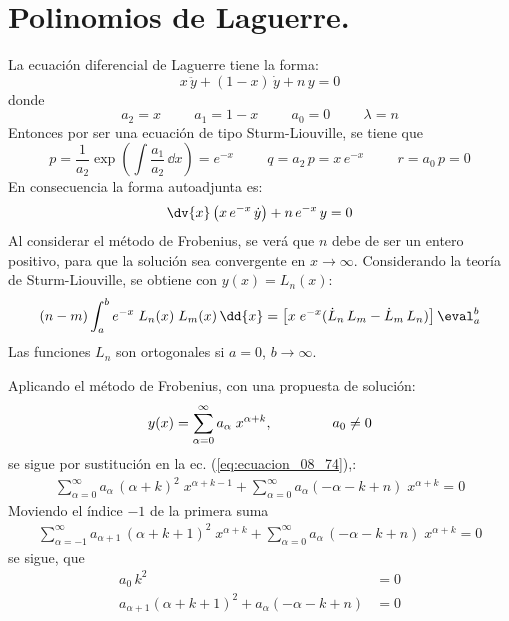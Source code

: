 \section{Polinomios de Laguerre.}
La ecuación diferencial de Laguerre tiene la forma:
\begin{equation}
x \, \ddot{y} + (1 - x) \, \dot{y} + n \, y = 0
\label{eq:ecuacion_08_74}
\end{equation}
donde
\[ a_{2} = x \hspace{1cm} a_{1} = 1 - x \hspace{1cm} a_{0} = 0 \hspace{1cm} \lambda = n \]
Entonces por ser una ecuación de tipo Sturm-Liouville, se tiene que
\[ p = \dfrac{1}{a_{2}} \exp \left( \int \frac{a_{1}}{a_{2}} \, \dd{x} \right) = e^{-x} \hspace{1cm} q = a_{2} \, p = x \, e^{-x} \hspace{1cm} r = a_{0} \, p = 0 \]
En consecuencia la forma autoadjunta es:
\[ \dv{x} \left( x \, e^{-x} \, \dot{y} \right) + n \, e^{-x} \,  y = 0  \]
Al considerar el método de Frobenius, se verá que $n$ debe de ser un entero positivo, para que la solución sea convergente en $x \to \infty$. Considerando la teoría de Sturm-Liouville, se obtiene con $y(x) = L_{n}(x)$:
\begin{equation}
(n - m) \int_{a}^{b} e^{-x} \; L_{n}(x) \; L_{m}(x) \, \dd{x} = \left[ x \; e^{-x} (\dot{L}_{n} \, L_{m} - \dot{L}_{m} \, L_{n}) \right]\eval_{a}^{b}
\label{eq:ecuacion_08_75}
\end{equation}
Las funciones $L_{n}$ son ortogonales si $a=0$, $b \to \infty$.
\par
Aplicando el método de Frobenius, con una propuesta de solución:
\[ y(x) = \sum_{\alpha = 0}^{\infty} a_{\alpha} \; x^{\alpha + k}, \hspace{1.5cm} a_{0} \neq 0 \]
se sigue por sustitución en la ec. (\ref{eq:ecuacion_08_74}),:
\begin{align*}
\sum_{\alpha = 0}^{\infty} a_{\alpha} \, (\alpha + k)^{2} \; x^{\alpha + k - 1} + \sum_{\alpha = 0}^{\infty} a_{\alpha} (- \alpha - k + n) \; x^{\alpha + k} = 0
\end{align*}
Moviendo el índice $-1$ de la primera suma
\begin{align*}
\sum_{\alpha = -1}^{\infty} a_{\alpha + 1} \, (\alpha + k + 1)^{2} \; x^{\alpha + k} + \sum_{\alpha = 0}^{\infty} a_{\alpha} \, (- \alpha - k + n) \; x^{\alpha + k} = 0
\end{align*}
se sigue, que
\begin{align*}
a_{0} \, k^{2} &= 0 \\
a_{\alpha + 1} (\alpha + k + 1)^{2} + a_{\alpha} (-\alpha - k + n) &= 0 
\end{align*}
